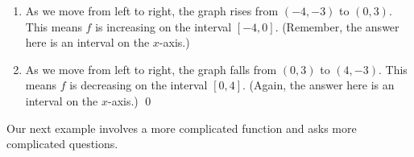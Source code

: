 \documentclass{ximera}
\begin{document}
\begin{example}
\begin{enumerate}
\item  As we move from left to right, the graph rises from $(-4,-3)$ to $(0,3)$.  This means $f$ is increasing on the interval $[-4,0]$.  (Remember, the answer here is an interval on the $x$-axis.)

\item  As we move from left to right, the graph falls from $(0,3)$ to $(4,-3)$.  This means $f$ is decreasing on the interval $[0,4]$.  (Again, the answer here is an interval on the $x$-axis.) \qed

\end{enumerate}

\end{example} 



Our next example involves a more complicated function and asks more complicated questions.
\end{document}
